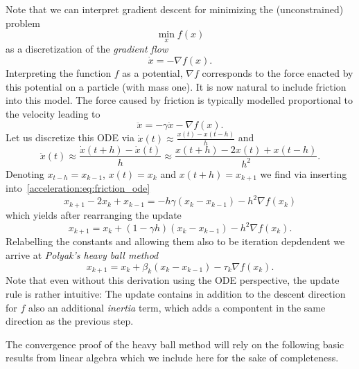 Note that we can interpret gradient descent for minimizing the (unconstrained) problem
\begin{equation}
    \min_x f(x)
\end{equation}
as a discretization of the \emph{gradient flow}
\begin{equation}
    \dot x  = -\nabla f(x).
\end{equation}
Interpreting the function $f$ as a potential, $\nabla f$ corresponds to the force enacted by this potential on a particle (with mass one). It is now natural to include friction into this model. The force caused by friction is typically modelled proportional to the velocity leading to
\begin{equation}\label{acceleration:eq:friction_ode}
    \ddot x = - \gamma \dot x -\nabla f(x).
\end{equation}
Let us discretize this ODE via $\dot x (t)\approx \frac{x(t)-x(t-h)}{h}$ and 
\begin{equation}
    \ddot x(t)
    \approx \frac{\dot x(t+h)-\dot x(t)}{h}
    \approx \frac{x(t+h)-2x(t)+x(t-h)}{h^2}.
\end{equation}
Denoting $x_{t-h}=x_{k-1}$, $x(t)=x_k$ and $x(t+h)=x_{k+1}$ we find via inserting into~\cref{acceleration:eq:friction_ode}
\begin{equation}
    x_{k+1} - 2x_k + x_{k-1} = -h\gamma (x_{k}-x_{k-1}) - h^2\nabla f(x_k)
\end{equation}
which yields after rearranging the update
\begin{equation}
    x_{k+1} = x_{k} + (1-\gamma h)(x_{k}-x_{k-1}) - h^2\nabla f(x_k).
\end{equation}
Relabelling the constants and allowing them also to be iteration depdendent we arrive at \emph{Polyak's heavy ball method}
\begin{equation}
    x_{k+1} = x_{k} + \beta_k(x_{k}-x_{k-1}) - \tau_k\nabla f(x_k).
\end{equation}
Note that even without this derivation using the ODE perspective, the update rule is rather intuitive: The update contains in addition to the descent direction for $f$ also an additional \emph{inertia} term, which adds a compontent in the same direction as the previous step.

The convergence proof of the heavy ball method will rely on the following basic results from linear algebra which we include here for the sake of completeness.

